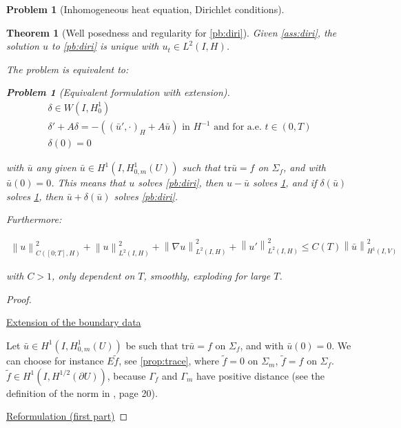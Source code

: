 \documentclass[english,a4paper,9pt,oneside]{scrbook}	%
\theoremstyle{break}
\newtheorem{thm}[equation]{Theorem}
\newtheorem{pb}[equation]{Problem}
\newenvironment{mproof}[1][\proofname]{%
  \begin{proof}[#1]$ $\par\nobreak\ignorespaces
}{%
  \end{proof}
}
\renewcommand*{\proofname}{Proof}
\theoremstyle{remark}
\newcommand{\norm}[1]{\left\lVert#1\right\rVert}
\newcommand{\tr}{\text{tr}}
\begin{document}
\begin{appendices}
\begin{pb}[Inhomogeneous heat equation, Dirichlet conditions]
\end{pb}

\begin{thm}[Well posedness and regularity for \cref{pb:diri}]
\label{prop:diri_wp}
Given \cref{ass:diri}, the solution $u$ to \cref{pb:diri} is unique with $u_t \in L^2(I,H)$. 


The problem is equivalent to:

\begin{pb}[Equivalent formulation with extension]
\label{pb:diri_ext}
\begin{align}
\delta \in W(I,H^1_0) \\
\delta' + A \delta = -((\bar{u}',\cdot)_H+A \bar{u}) \text{ in }H^{-1} \text{ and for a.e. } t \in (0,T) \\
\delta(0)=0
\end{align}
\end{pb}

with $\bar{u}$ any given $\bar{u}\in H^1(I,H^1_{0,m}(U))$ such that $\tr \bar{u} =f$ on $\Sigma_f$, and with $\bar{u}(0)=0$. This means that $u$ solves \cref{pb:diri}, then $u-\bar{u}$ solves \cref{pb:diri_ext}, and if $\delta(\bar{u})$ solves  \cref{pb:diri_ext}, then $\bar{u}+\delta(\bar{u})$ solves \cref{pb:diri}.

Furthermore: 

\begin{align}
\norm{u}^2_{C([0;T],H)}+\norm{u}_{L^2(I,H)}^2+ \norm{\nabla u}_{L^2(I,H)}^2 + \norm{u'}^2_{L^2(I,H)}\leq C(T)\norm{\bar{u}}_{H^1(I,V)}^2
\end{align}

with $C>1$, only dependent on $T$, smoothly, exploding for large $T$.

\end{thm}
\begin{mproof}

\underline{Extension of the boundary data}

Let $\bar{u}\in H^1(I,H^1_{0,m}(U))$ be such that $\tr \bar{u} =f$ on $\Sigma_f$, and with $\bar{u}(0)=0$. We can choose for instance $E\tilde{f}$, see \cref{prop:trace}, where $\tilde{f}=0$ on $\Sigma_m$, $\tilde{f}=f$ on $\Sigma_f$. $\tilde{f} \in H^1(I,H^{1/2}(\partial U))$, because $\Gamma_f$ and $\Gamma_m$ have positive distance (see the definition of the norm in \cite{grisvard}, page 20).  

\underline{Reformulation (first part)}


\end{mproof}
\end{appendices}
\end{document}
